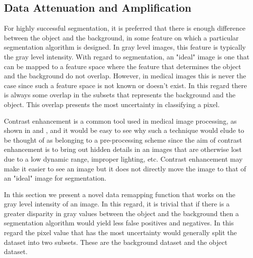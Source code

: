 \documentclass[a4paper,11pt]{ijamas}
\begin{document}
\subsection{Data Attenuation and Amplification}
\label{sec:proposed_remapping}
For highly successful segmentation, it is preferred that there is enough difference between the object and the background, in some feature on which a particular segmentation algorithm is designed. In gray level images, this feature is typically the gray level intensity.
With regard to segmentation, an "ideal" image is one that can be mapped to a feature space where the feature that determines the object and the background do not overlap. However, in medical images this is never the case since such a feature space is not known or doesn't exist. In this regard there is always some overlap in the subsets that represents the background and the object.
This overlap presents the most uncertainty in classifying a pixel.

Contrast enhancement is a common tool used in medical image processing, as shown in \cite{kim:2003} and \cite{subr:2005}, and it would be easy to see why such a technique would elude to be thought of as belonging to a pre-processing scheme since the aim of contrast enhancement is to bring out hidden details in an images that are otherwise lost due to a low dynamic range, improper lighting, etc.
Contrast enhancement may make it easier to see an image but it does not directly move the image to that of an "ideal" image for segmentation.

In this section we present a novel data remapping function that works on the gray level intensity of an image.
In this regard, it is trivial that if there is a greater disparity in gray values between the object and the background then a segmentation algorithm would yield less false positives and negatives.
In this regard the pixel value that has the most uncertainty would generally split the dataset into two subsets. These are the background dataset and the object dataset.
\end{document}

